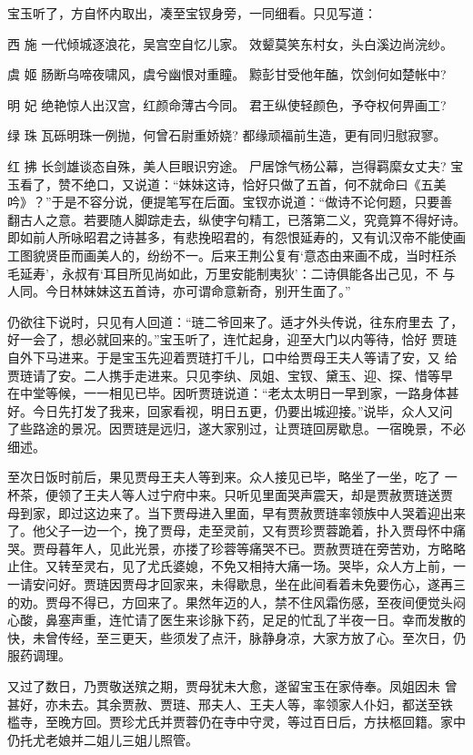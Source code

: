 宝玉听了，方自怀内取出，凑至宝钗身旁，一同细看。只见写道：

西
施
一代倾城逐浪花，吴宫空自忆儿家。
效颦莫笑东村女，头白溪边尚浣纱。

虞
姬
肠断乌啼夜啸风，虞兮幽恨对重瞳。
黥彭甘受他年醢，饮剑何如楚帐中?

明
妃
绝艳惊人出汉宫，红颜命薄古今同。
君王纵使轻颜色，予夺权何畀画工?

绿
珠
瓦砾明珠一例抛，何曾石尉重娇娆?
都缘顽福前生造，更有同归慰寂寥。

红
拂
长剑雄谈态自殊，美人巨眼识穷途。
尸居馀气杨公幕，岂得羁縻女丈夫?
宝玉看了，赞不绝口，又说道：“妹妹这诗，恰好只做了五首，何不就命曰《五美
吟》？”于是不容分说，便提笔写在后面。宝钗亦说道：“做诗不论何题，只要善
翻古人之意。若要随人脚踪走去，纵使字句精工，已落第二义，究竟算不得好诗。
即如前人所咏昭君之诗甚多，有悲挽昭君的，有怨恨延寿的，又有讥汉帝不能使画
工图貌贤臣而画美人的，纷纷不一。后来王荆公复有‘意态由来画不成，当时枉杀
毛延寿’，永叔有‘耳目所见尚如此，万里安能制夷狄’：二诗俱能各出己见，不
与人同。今日林妹妹这五首诗，亦可谓命意新奇，别开生面了。”

仍欲往下说时，只见有人回道：“琏二爷回来了。适才外头传说，往东府里去
了，好一会了，想必就回来的。”宝玉听了，连忙起身，迎至大门以内等待，恰好
贾琏自外下马进来。于是宝玉先迎着贾琏打千儿，口中给贾母王夫人等请了安，又
给贾琏请了安。二人携手走进来。只见李纨、凤姐、宝钗、黛玉、迎、探、惜等早
在中堂等候，一一相见已毕。因听贾琏说道：“老太太明日一早到家，一路身体甚
好。今日先打发了我来，回家看视，明日五更，仍要出城迎接。”说毕，众人又问
了些路途的景况。因贾琏是远归，遂大家别过，让贾琏回房歇息。一宿晚景，不必
细述。

至次日饭时前后，果见贾母王夫人等到来。众人接见已毕，略坐了一坐，吃了
一杯茶，便领了王夫人等人过宁府中来。只听见里面哭声震天，却是贾赦贾琏送贾
母到家，即过这边来了。当下贾母进入里面，早有贾赦贾琏率领族中人哭着迎出来
了。他父子一边一个，挽了贾母，走至灵前，又有贾珍贾蓉跪着，扑入贾母怀中痛
哭。贾母暮年人，见此光景，亦搂了珍蓉等痛哭不已。贾赦贾琏在旁苦劝，方略略
止住。又转至灵右，见了尤氏婆媳，不免又相持大痛一场。哭毕，众人方上前，一
一请安问好。贾琏因贾母才回家来，未得歇息，坐在此间看着未免要伤心，遂再三
的劝。贾母不得已，方回来了。果然年迈的人，禁不住风霜伤感，至夜间便觉头闷
心酸，鼻塞声重，连忙请了医生来诊脉下药，足足的忙乱了半夜一日。幸而发散的
快，未曾传经，至三更天，些须发了点汗，脉静身凉，大家方放了心。至次日，仍
服药调理。

又过了数日，乃贾敬送殡之期，贾母犹未大愈，遂留宝玉在家侍奉。凤姐因未
曾甚好，亦未去。其余贾赦、贾琏、邢夫人、王夫人等，率领家人仆妇，都送至铁
槛寺，至晚方回。贾珍尤氏并贾蓉仍在寺中守灵，等过百日后，方扶柩回籍。家中
仍托尤老娘并二姐儿三姐儿照管。

